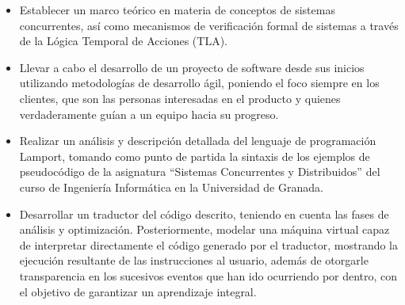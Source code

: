 \begin{itemize}
    \item Establecer un marco teórico en materia de conceptos de sistemas concurrentes, así como mecanismos de verificación formal de sistemas a través de la Lógica Temporal de Acciones (TLA).
    \item Llevar a cabo el desarrollo de un proyecto de software desde sus inicios utilizando metodologías de desarrollo ágil, poniendo el foco siempre en los clientes, que son las personas interesadas en el producto y quienes verdaderamente guían a un equipo hacia su progreso.
    \item Realizar un análisis y descripción detallada del lenguaje de programación Lamport, tomando como punto de partida la sintaxis de los ejemplos de pseudocódigo de la asignatura ``Sistemas Concurrentes y Distribuidos'' del curso de Ingeniería Informática en la Universidad de Granada.
    \item Desarrollar un traductor del código descrito, teniendo en cuenta las fases de análisis y optimización. Posteriormente, modelar una máquina virtual capaz de interpretar directamente el código generado por el traductor, mostrando la ejecución resultante de las instrucciones al usuario, además de otorgarle transparencia en los sucesivos eventos que han ido ocurriendo por dentro, con el objetivo de garantizar un aprendizaje integral.
\end{itemize}
